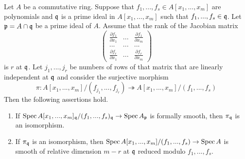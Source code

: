 \begin{proposition}\label{proposition:jacobian_criterion}
Let $A$ be a commutative ring. Suppose that $f_1,...,f_s\in A[x_1,...,x_m]$ are polynomials and $\mathfrak{q}$ is a prime ideal in $A[x_1,...,x_m]$ such that $f_1,...,f_s\in \mathfrak{q}$. Let $\mathfrak{p} = A\cap \mathfrak{q}$ be a prime ideal of $A$. Assume that the rank of the Jacobian matrix
$$\begin{pmatrix}
\frac{\partial f_1}{\partial x_1} & ... & \frac{\partial f_1}{\partial x_{m}} \\
... &...  &...  \\
\frac{\partial f_r}{\partial x_{1}} &...  & \frac{\partial f_r}{\partial x_{m}}\end{pmatrix}$$
is $r$ at $\mathfrak{q}$. Let $j_1,...,j_r$ be numbers of rows of that matrix that are linearly independent at $\mathfrak{q}$ and consider the surjective morphism
$$\pi:A[x_1,...,x_m]/(f_{j_1},...,f_{j_r}) \twoheadrightarrow A[x_1,...,x_m]/(f_1,...,f_s)$$
Then the following assertions hold.
\begin{enumerate}[label=\emph{\textbf{(\arabic*)}}, leftmargin=3.0em]
\item If $\mathrm{Spec}\, A[x_1,...,x_m]_{\mathfrak{q}}/(f_1,...,f_s)_{\mathfrak{q}} \rightarrow \mathrm{Spec}\, A_{\mathfrak{p}}$ is formally smooth, then $\pi_{\mathfrak{q}}$ is an isomorphism.
\item If $\pi_{\mathfrak{q}}$ is an isomorphism, then $\mathrm{Spec}\, A[x_1,...,x_m]/(f_1,...,f_s)\rightarrow \mathrm{Spec}\, A$ is smooth of relative dimension $m-r$ at $\mathfrak{q}$ reduced modulo $f_1,...,f_s$.
\end{enumerate}
\end{proposition}
